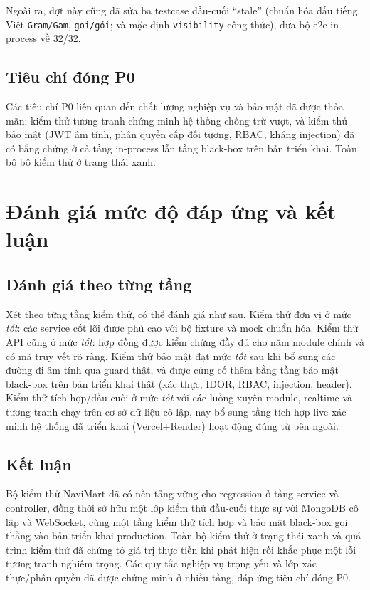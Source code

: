 \documentclass[12pt,a4paper]{article}
\newcommand{\code}[1]{\texttt{#1}}
\begin{document}
Ngoài ra, đợt này cũng đã sửa ba testcase đầu-cuối ``stale'' (chuẩn hóa dấu tiếng Việt \code{Gram/Gam},
\code{goi/gói}; và mặc định \code{visibility} công thức), đưa bộ e2e in-process về 32/32.

\subsection{Tiêu chí đóng P0}

Các tiêu chí P0 liên quan đến chất lượng nghiệp vụ và bảo mật đã được thỏa mãn: kiểm thử tương tranh chứng
minh hệ thống chống trừ vượt, và kiểm thử bảo mật (JWT âm tính, phân quyền cấp đối tượng, RBAC, kháng
injection) đã có bằng chứng ở cả tầng in-process lẫn tầng black-box trên bản triển khai. Toàn bộ bộ kiểm thử
ở trạng thái xanh.

\section{Đánh giá mức độ đáp ứng và kết luận}

\subsection{Đánh giá theo từng tầng}

Xét theo từng tầng kiểm thử, có thể đánh giá như sau. Kiểm thử đơn vị ở mức \emph{tốt}: các service cốt lõi
được phủ cao với bộ fixture và mock chuẩn hóa. Kiểm thử API cũng ở mức \emph{tốt}: hợp đồng được kiểm chứng
đầy đủ cho năm module chính và có mã truy vết rõ ràng. Kiểm thử bảo mật đạt mức \emph{tốt} sau khi bổ sung
các đường đi âm tính qua guard thật, và được củng cố thêm bằng tầng bảo mật black-box trên bản triển khai
thật (xác thực, IDOR, RBAC, injection, header). Kiểm thử tích hợp/đầu-cuối ở mức \emph{tốt} với các luồng
xuyên module, realtime và tương tranh chạy trên cơ sở dữ liệu cô lập, nay bổ sung tầng tích hợp live xác minh
hệ thống đã triển khai (Vercel+Render) hoạt động đúng từ bên ngoài.

\subsection{Kết luận}

Bộ kiểm thử NaviMart đã có nền tảng vững cho regression ở tầng service và controller, đồng thời sở hữu một
lớp kiểm thử đầu-cuối thực sự với MongoDB cô lập và WebSocket, cùng một tầng kiểm thử tích hợp và bảo mật
black-box gọi thẳng vào bản triển khai production. Toàn bộ kiểm thử ở trạng thái xanh và quá trình kiểm thử
đã chứng tỏ giá trị thực tiễn khi phát hiện rồi khắc phục một lỗi tương tranh nghiêm trọng. Các quy tắc
nghiệp vụ trọng yếu và lớp xác thực/phân quyền đã được chứng minh ở nhiều tầng, đáp ứng tiêu chí đóng P0.
\end{document}
